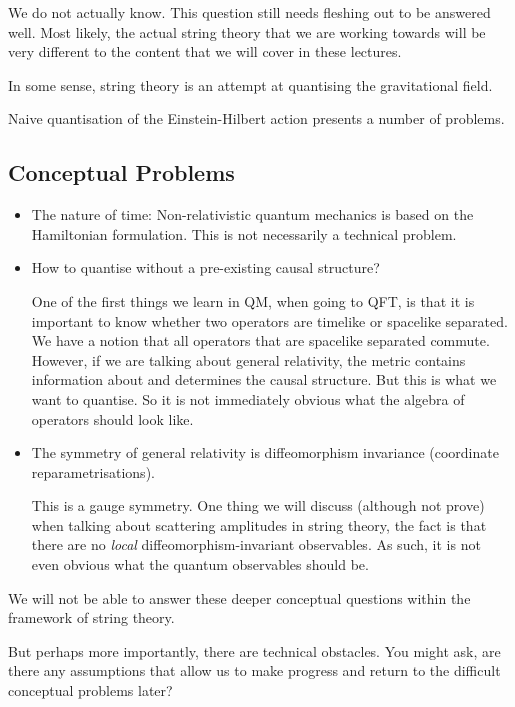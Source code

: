 We do not actually know. This question still needs fleshing out to be answered well.
Most likely, the actual string theory that we are working towards will be very different to the content that we will cover in these lectures.

In some sense, string theory is an attempt at quantising the gravitational field.

Naive quantisation of the Einstein-Hilbert action presents a number of problems.

\subsection*{Conceptual Problems}%

\begin{itemize}
  \item The nature of time: Non-relativistic quantum mechanics is based on the Hamiltonian formulation.
    This is not necessarily a technical problem.

  \item How to quantise without a pre-existing causal structure?

    One of the first things we learn in QM, when going to QFT, is that it is important to know whether two operators are timelike or spacelike separated. 
    We have a notion that all operators that are spacelike separated commute.
    However, if we are talking about general relativity, the metric contains information about and determines the causal structure. But this is what we want to quantise. So it is not immediately obvious what the algebra of operators should look like.

  \item The symmetry of general relativity is diffeomorphism invariance (coordinate reparametrisations).

    This is a gauge symmetry.
    One thing we will discuss (although not prove) when talking about scattering amplitudes in string theory, the fact is that there are  no \emph{local} diffeomorphism-invariant observables.
    As such, it is not even obvious what the quantum observables should be.
\end{itemize}

We will not be able to answer these deeper conceptual questions within the framework of string theory.

But perhaps more importantly, there are technical obstacles.
You might ask, are there any assumptions that allow us to make progress and return to the difficult conceptual problems later?

